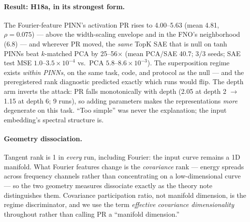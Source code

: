 \documentclass{article}
\begin{document}
\paragraph{Result: H18a, in its strongest form.} The Fourier-feature
PINN's activation PR rises to 4.00--5.63 (mean 4.81, $\rho = 0.075$) ---
above the width-scaling envelope and in the FNO's neighborhood (6.8) ---
and wherever PR moved, the \emph{same} TopK SAE that is null on tanh
PINNs beat $k$-matched PCA by 25--56$\times$ (mean PCA/SAE 40.7; 3/3
seeds; SAE test MSE $1.0$--$3.5\times10^{-4}$ vs.\ PCA
$5.8$--$8.6\times10^{-3}$). The superposition regime exists
\emph{within PINNs}, on the same task, code, and protocol as the null ---
and the preregistered rank diagnostic predicted exactly which runs would
flip. The depth arm inverts the attack: PR falls monotonically with
depth (2.05 at depth 2 $\to$ 1.15 at depth 6; 9 runs), so adding
parameters makes the representations \emph{more} degenerate on this
task. ``Too simple'' was never the explanation; the input embedding's
spectral structure is.

\paragraph{Geometry dissociation.} Tangent rank is 1 in \emph{every}
run, including Fourier: the input curve remains a 1D manifold. What
Fourier features change is the \emph{covariance} rank --- energy spreads
across frequency channels rather than concentrating on a low-dimensional
curve --- so the two geometry measures dissociate exactly as the theory
note distinguishes them. Covariance participation ratio, not manifold
dimension, is the regime discriminator, and we use the term
\emph{effective covariance dimensionality} throughout rather than
calling PR a ``manifold dimension.''
\end{document}
